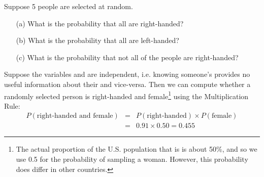 \begin{exercisewrap}
\begin{nexercise}
\label{ex5Handedness}%
Suppose 5 people are selected at random.\footnotemark\vspace{-1.5mm}
\begin{enumerate}
\setlength{\itemsep}{0mm}
\item[(a)] What is the probability that all are right-handed?
\item[(b)] What is the probability that all are left-handed?
\item[(c)] What is the probability that not all of the people are right-handed?
\end{enumerate}
\end{nexercise}
\end{exercisewrap}

Suppose the variables  and  are independent, i.e. knowing someone's  provides no useful information about their  and vice-versa. Then we can compute whether a randomly selected person is right-handed and female\footnote{The actual proportion of the U.S. population that is  is about 50\%, and so we use 0.5 for the probability of sampling a woman. However, this probability does differ in other countries.} using the Multiplication Rule:
\begin{eqnarray*}
P(\text{right-handed and female}) &=& P(\text{right-handed}) \times  P(\text{female}) \\
&=& 0.91 \times  0.50 = 0.455
\end{eqnarray*}



